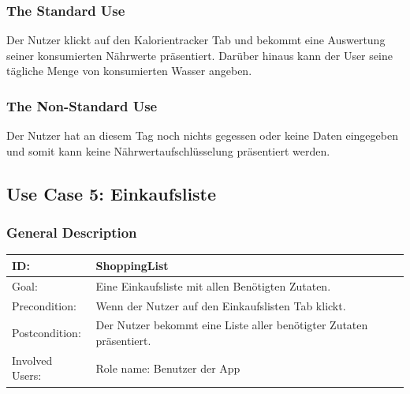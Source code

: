 \documentclass[12pt]{article}
\theoremstyle{definition}
\begin{document}
\subsubsection{The Standard Use}
Der Nutzer klickt auf den Kalorientracker Tab und bekommt eine Auswertung seiner konsumierten Nährwerte präsentiert. Darüber hinaus kann der User seine tägliche Menge von konsumierten Wasser angeben.

\subsubsection{The Non-Standard Use}
Der Nutzer hat an diesem Tag noch nichts gegessen oder keine Daten eingegeben und somit kann keine Nährwertaufschlüsselung präsentiert werden.
\pagebreak



\subsection{Use Case 5: Einkaufsliste}

\subsubsection{General Description}

\begin{tabular}{|p{.2\linewidth}|p{.65\linewidth}|}
\hline 
ID: & ShoppingList \\ \hline
Goal: & Eine Einkaufsliste mit allen Benötigten Zutaten. \\ \hline
Precondition: & Wenn der Nutzer auf den Einkaufslisten Tab klickt. \\ \hline
Postcondition: & Der Nutzer bekommt eine Liste aller benötigter Zutaten präsentiert. \\ \hline
Involved Users: &Role name: Benutzer der App \\ \hline
\end{tabular}
\end{document}
